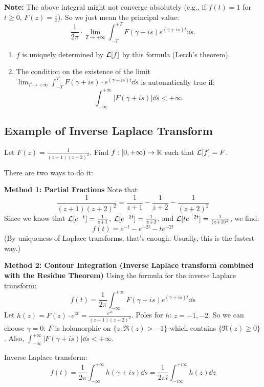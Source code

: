 \textbf{Note:} The above integral might not converge absolutely (e.g., if $f(t)=1$ for $t \ge 0$, $F(z) = \frac{1}{z}$). So we just mean the principal value:
$$\frac{1}{2\pi} \cdot \lim_{T\rightarrow+\infty} \int_{-T}^{+T} F(\gamma+is) e^{(\gamma+is)t} \dd s.$$

\begin{remark}[Remarks]
\begin{enumerate}
    \item $f$ is uniquely determined by $\mathcal{L}[f]$ by this formula (Lerch's theorem).
    \item The condition on the existence of the limit $\lim_{T\rightarrow+\infty} \int_{-T}^{T} F(\gamma+is) \cdot e^{(\gamma+is)t} \dd s$ is automatically true if:
    $$\int_{-\infty}^{+\infty} |F(\gamma+is)| \dd s < +\infty.$$
\end{enumerate}
\end{remark}

\subsection{Example of Inverse Laplace Transform}

\begin{example}
Let $F(z) = \frac{1}{(z+1)(z+2)^2}$. Find $f : [0, +\infty) \rightarrow \mathbb{R}$ such that $\mathcal{L}[f] = F$.

There are two ways to do it:

\textbf{Method 1: Partial Fractions}
Note that
$$\frac{1}{(z+1)(z+2)^2} = \frac{1}{z+1} - \frac{1}{z+2} - \frac{1}{(z+2)^2}$$
Since we know that $\mathcal{L}[e^{-t}] = \frac{1}{z+1}$, $\mathcal{L}[e^{-2t}] = \frac{1}{z+2}$, and $\mathcal{L}[t e^{-2t}] = \frac{1}{(z+2)^2}$, we find:
$$f(t) = e^{-t} - e^{-2t} - t e^{-2t}$$
(By uniqueness of Laplace transforms, that's enough. Usually, this is the fastest way.)

\textbf{Method 2: Contour Integration (Inverse Laplace transform combined with the Residue Theorem)}
Using the formula for the inverse Laplace transform:
$$f(t) = \frac{1}{2\pi} \int_{-\infty}^{+\infty} F(\gamma+is) e^{(\gamma+is)t} \dd s$$
Let $h(z) = F(z) \cdot e^{zt} = \frac{e^{zt}}{(z+1)(z+2)^2}$.
Poles for $h$: $z = -1, -2$.
So we can choose $\gamma = 0$: $F$ is holomorphic on $\{z : \Re(z) > -1\}$ which contains $\{\Re(z) \ge 0\}$.
Also, $\int_{-\infty}^{+\infty} |F(\gamma+is)| \dd s < +\infty$.
\end{example}

Inverse Laplace transform:
$$f(t) = \frac{1}{2\pi} \int_{-\infty}^{+\infty} h(\gamma+is) \dd s = \frac{1}{2\pi i} \int_{-i\infty}^{+i\infty} h(z) \dd z$$

